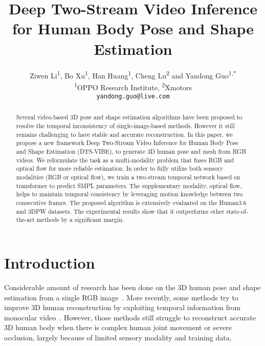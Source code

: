 \documentclass[10pt,twocolumn,letterpaper]{article}
\begin{document}
\title{Deep Two-Stream Video Inference for Human Body Pose and Shape Estimation}
\author{Ziwen Li\textsuperscript{1}, Bo Xu\textsuperscript{1}, Han Huang\textsuperscript{1}, Cheng Lu\textsuperscript{2} and Yandong Guo\textsuperscript{1,*}\\
\textsuperscript{1}OPPO Research Institute, \textsuperscript{2}Xmotors\\
{\tt\small yandong.guo@live.com}
}
\maketitle
\ifwacvfinal\thispagestyle{empty}\fi
\pagestyle{empty}  \thispagestyle{empty} \begin{abstract}
Several video-based 3D pose and shape estimation algorithms have been proposed to resolve the temporal inconsistency of single-image-based methods. However it still remains challenging to have stable and accurate reconstruction. In this paper, we propose a new framework Deep Two-Stream Video Inference for Human Body Pose and Shape Estimation (DTS-VIBE), to generate 3D human pose and mesh from RGB videos. We reformulate the task as a multi-modality problem that fuses RGB and optical flow for more reliable estimation. In order to fully utilize both sensory modalities (RGB or optical flow), we train a two-stream temporal network based on transformer to predict SMPL parameters. The supplementary modality, optical flow, helps to maintain temporal consistency by leveraging motion knowledge between two consecutive frames. The proposed algorithm is extensively evaluated on the Human3.6 and 3DPW datasets. The experimental results show that it outperforms other state-of-the-art methods by a significant margin.
\end{abstract}



\section{Introduction}
Considerable amount of research has been done on the 3D human pose and shape estimation from a single RGB image~\cite{kocabas2020vibe,varol2018bodynet,kolotouros2019learning,kanazawa2019learning}. More recently, some methods try to improve 3D human reconstruction by exploiting temporal information from monocular video~\cite{kocabas2020vibe,kanazawa2019learning}. However, those methods still struggle to reconstruct accurate 3D human body when there is complex human joint movement or severe occlusion, largely because of limited sensory modality and training data.
\end{document}
